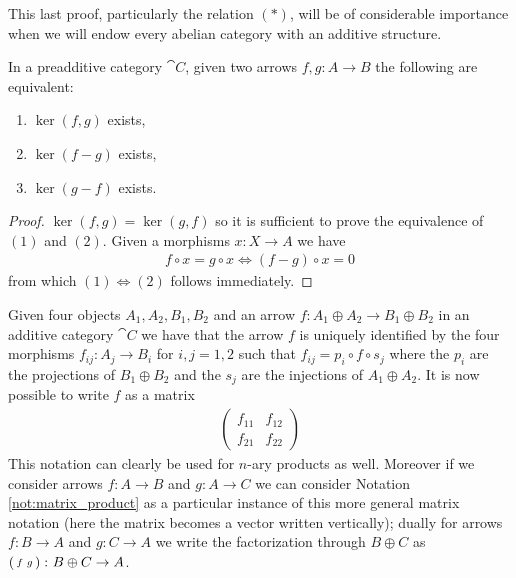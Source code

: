 This last proof, particularly the relation \((*)\), will be of considerable importance when we will endow every abelian category with an additive structure.

\begin{proposition}
  \label{prop:kernels_in_preadditive_category}
  In a preadditive category \(\cat{C}\), given two arrows \(f,g\colon A\to B\) the following are equivalent:
  \begin{enumerate}[label=(\arabic*)]
  \item \(\ker(f,g)\) exists,
  \item \(\ker(f-g)\) exists,
  \item \(\ker(g-f)\) exists.
  \end{enumerate}
\end{proposition}

\begin{proof}
  \(\ker(f,g) = \ker(g, f)\) so it is sufficient to prove the equivalence of \((1)\) and \((2)\). Given a morphisms \(x\colon X\to A\) we have
  \begin{align*}
    f\circ x = g\circ x \Leftrightarrow (f - g)\circ x = 0
  \end{align*}
  from which \((1)\Leftrightarrow(2)\) follows immediately.
\end{proof}

\begin{notation}
  \label{not:matrices}
  Given four objects \(A_1,A_2,B_1,B_2\) and an arrow \(f\colon A_1\oplus A_2\to B_1\oplus B_2\) in an additive category \(\cat{C}\) we have that the arrow \(f\) is uniquely identified by the four morphisms \(f_{ij}\colon A_j\to B_i\) for \(i,j=1,2\) such that \(f_{ij}=p_i\circ f\circ s_j\) where the \(p_i\) are the projections of \(B_1\oplus B_2\) and the \(s_j\) are the injections of \(A_1\oplus A_2\). It is now possible to write \(f\) as a matrix
  \begin{align*}
    \begin{pmatrix}
      f_{11} & f_{12}\\
      f_{21} & f_{22}
    \end{pmatrix}
  \end{align*}
  This notation can clearly be used for \(n\)-ary products as well. Moreover if we consider arrows \(f\colon A\to B\) and \(g\colon A\to C\) we can consider Notation \ref{not:matrix_product} as a particular instance of this more general matrix notation (here the matrix becomes a vector written vertically); dually for arrows \(f\colon B\to A\) and \(g\colon C\to A\) we write the factorization through \(B\oplus C\) as \(\left(\begin{smallmatrix}f & g\end{smallmatrix}\right)\colon B\oplus C\to A\).
\end{notation}

